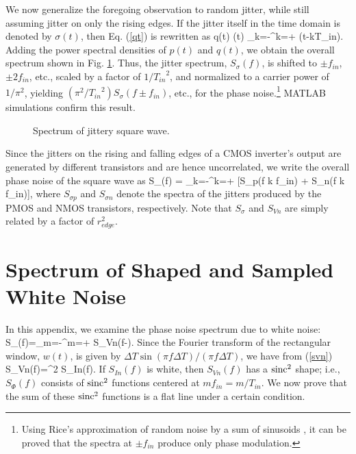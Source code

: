 We now generalize the foregoing observation to random jitter, while still assuming jitter on only the rising edges. If the jitter itself in the time
domain is denoted by $\sigma (t)$, then Eq. (\ref{qt}) is rewritten as 
\beq
q(t) \approx  \sigma (t) \sum_{k=-\infty}^{k=+\infty} \delta (t-k{T_{in}}).
\label{qtrandom}
\eeq
Adding the power spectral densities of $p(t)$ and $q(t)$, we obtain the overall spectrum shown in Fig. \ref{psdrising}. Thus, the jitter spectrum,
$S_\sigma(f)$, is shifted to $\pm f_{in}$, $\pm 2f_{in}$, etc., scaled by a factor of $1/{T_{in}}^2$, and normalized to a carrier power of $1/\pi
^2$, yielding $(\pi^2/{T_{in}}^2)S_\sigma(f \pm f_{in})$, etc., for the phase noise.\footnote{Using Rice's approximation of random noise by a sum of
sinusoids \cite{Rice}, it can be proved that the spectra at $\pm f_{in}$ produce only phase modulation.} MATLAB simulations confirm this result.
\begin{figure}[htb]
\vspace{1.2in}
\caption{Spectrum of jittery square wave.}
\label{psdrising}
\end{figure}

Since the jitters on the rising and falling edges of a CMOS inverter's output are generated by different transistors and are hence uncorrelated, we
write the overall phase noise of the square wave as
\beq
S_\Phi(f) = \sum_{k=-\infty}^{k=+\infty} [S_{\sigma p}(f \pm k f_{in}) + S_{\sigma n}(f \pm k f_{in})],
\label{sphiuncorrelated}
\eeq
where $S_{\sigma p}$ and $S_{\sigma n}$ denote the spectra of the jitters produced by the PMOS and NMOS transistors, respectively. Note that $S_\sigma$ and
$S_{Vn}$ are simply related by a factor of $r_{edge}^2$.


\section{Spectrum of Shaped and Sampled White Noise}
In this appendix, we examine the phase noise spectrum due to white noise:
\beq
S_{\Phi}(f)=\sum_{m=-\infty}^{m=+\infty} S_{Vn}(f-).
\label{sphia1}
\eeq
Since the Fourier transform of the rectangular window, $w(t)$, is given by $\Delta T \sin(\pi f \Delta T)/(\pi f \Delta T)$, we have from (\ref{svn})
\beq
S_{Vn}(f)=^2 S_{In}(f).
\label{svna}
\eeq
If $S_{In}(f)$ is white, then $S_{Vn}(f)$ has a $\rm sinc^2$ shape; i.e., $S_{\Phi}(f)$ consists of $\rm sinc^2$ functions centered at $m f_{in}=m/T_{in}$.
We now prove that the sum of these $\rm sinc^2$ functions is a flat line under a certain condition.

